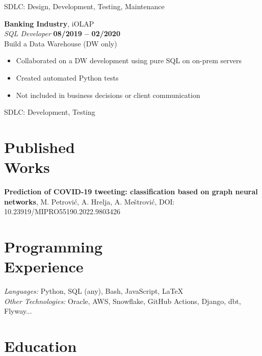 \documentclass[margin,line]{resume}
\begin{document}
\begin{resume}
\begin{itemize}
    \end{itemize}

    SDLC: Design, Development, Testing, Maintenance

    \textbf{Banking Industry}, iOLAP \vspace{2mm}\\\vspace{1mm}%
    \textsl{SQL Developer} \hfill \textbf{08/2019 -- 02/2020}\\
    Build a Data Warehouse (DW only)

    \begin{itemize}
        \item Collaborated on a DW development using pure SQL on on-prem servers
		\item Created automated Python tests
		\item Not included in business decisions or client communication
		
    \end{itemize}

    SDLC: Development, Testing


    \vspace{3mm}
    
    \section{\mysidestyle Published\\Works}

    \textbf{Prediction of COVID-19 tweeting: classification based on graph neural networks}, M. Petrović, A. Hrelja, A. Meštrović, DOI: 10.23919/MIPRO55190.2022.9803426


    \vspace{3mm}

    \section{\mysidestyle Programming\\Experience}

    \emph{Languages:} Python, SQL (any), Bash, JavaScript, \LaTeX \\
    \emph{Other Technologies:} Oracle, AWS, Snowflake, GitHub Actions, Django, dbt, Flyway...

    \vspace{3mm}

    \section{\mysidestyle Education}


\end{resume}
\end{document}

